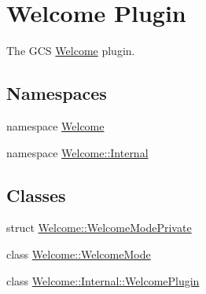 \hypertarget{group___welcome_plugin}{\section{Welcome Plugin}
\label{group___welcome_plugin}
}


The G\-C\-S \hyperlink{namespace_welcome}{Welcome} plugin.  


\subsection*{Namespaces}
\begin{DoxyCompactItemize}
\item 
namespace \hyperlink{namespace_welcome}{Welcome}
\item 
namespace \hyperlink{namespace_welcome_1_1_internal}{Welcome\-::\-Internal}
\end{DoxyCompactItemize}
\subsection*{Classes}
\begin{DoxyCompactItemize}
\item 
struct \hyperlink{struct_welcome_1_1_welcome_mode_private}{Welcome\-::\-Welcome\-Mode\-Private}
\item 
class \hyperlink{class_welcome_1_1_welcome_mode}{Welcome\-::\-Welcome\-Mode}
\item 
class \hyperlink{class_welcome_1_1_internal_1_1_welcome_plugin}{Welcome\-::\-Internal\-::\-Welcome\-Plugin}
\end{DoxyCompactItemize}
